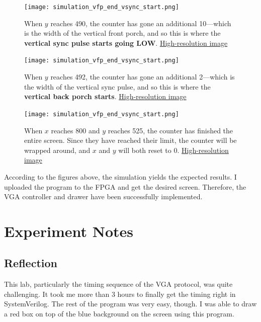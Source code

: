 \documentclass[12pt]{article}
\numberwithin{figure}{section}
\begin{document}
\begin{figure}[ht!]
  \centering
  \texttt{[image: simulation\_vfp\_end\_vsync\_start.png]}
  \caption{When $y$ reaches 490, the counter has gone an additional 10---which is the width of the vertical front porch, and so this is where the \textbf{vertical sync pulse starts going LOW}. \href{https://i.imgur.com/inYrF2u.jpg}{High-resolution image}}
\end{figure}

\newpage

\begin{figure}[ht]
  \centering
  \texttt{[image: simulation\_vfp\_end\_vsync\_start.png]}
  \caption{When $y$ reaches 492, the counter has gone an additional 2---which is the width of the vertical sync pulse, and so this is where the \textbf{vertical back porch starts}. \href{https://i.imgur.com/c5Ki9mq.jpg}{High-resolution image}}
\end{figure}

\begin{figure}[ht!]
  \centering
  \texttt{[image: simulation\_vfp\_end\_vsync\_start.png]}
  \caption{When $x$ reaches 800 and $y$ reaches 525, the counter has finished the entire screen. Since they have reached their limit, the counter will be wrapped around, and $x$ and $y$ will both reset to 0. \href{https://i.imgur.com/vl7NCR8.jpg}{High-resolution image}}
\end{figure}

\newpage

According to the figures above, the simulation yields the expected results. I uploaded the program to the FPGA and get the desired screen. Therefore, the VGA controller and drawer have been successfully implemented.

\section{Experiment Notes}

\subsection*{Reflection}

This lab, particularly the timing sequence of the VGA protocol, was quite challenging. It took me more than 3 hours to finally get the timing right in SystemVerilog. The rest of the program was very easy, though. I was able to draw a red box on top of the blue background on the screen using this program.
\end{document}
